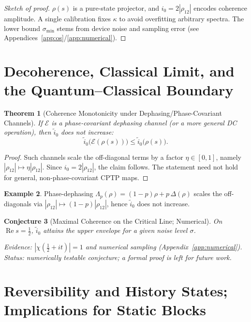 \documentclass[11pt]{article}
\newtheorem{theorem}{Theorem}[section]
\newtheorem{conjecture}[theorem]{Conjecture}
\theoremstyle{definition}
\newtheorem{example}[theorem]{Example}
\theoremstyle{remark}
\begin{document}
\begin{proof}[Sketch of proof]
\( \rho(s) \) is a pure-state projector, and \( i_0=2|\rho_{12}| \) encodes coherence amplitude. A single calibration fixes \( \kappa \) to avoid overfitting arbitrary spectra. The lower bound \( \sigma_{\min} \) stems from device noise and sampling error (see Appendices~\ref{app:os}/\ref{app:numerical}).
\end{proof}

\section{Decoherence, Classical Limit, and the Quantum--Classical Boundary}\label{sec:decoherence}

\begin{theorem}[Coherence Monotonicity under Dephasing/Phase-Covariant Channels]\label{thm:coherence}
If \( \mathcal{E} \) is a phase-covariant dephasing channel (or a more general DC operation), then \( \tilde i_0 \) does not increase:
\[
\tilde i_0\big(\mathcal{E}(\rho(s))\big) \le \tilde i_0\big(\rho(s)\big).
\]
\end{theorem}

\begin{proof}
Such channels scale the off-diagonal terms by a factor \( \eta\in[0,1] \), namely \( |\rho_{12}|\mapsto \eta|\rho_{12}| \). Since \( i_0=2|\rho_{12}| \), the claim follows. The statement need not hold for general, non-phase-covariant CPTP maps.
\end{proof}

\begin{example}
Phase-dephasing \( \Lambda_p(\rho)=(1-p)\rho+p\,\Delta(\rho) \) scales the off-diagonals via \( |\rho_{12}|\mapsto (1-p)|\rho_{12}| \), hence \( \tilde i_0 \) does not increase.
\end{example}

\begin{conjecture}[Maximal Coherence on the Critical Line; Numerical]\label{conj:maximal}
On \( \operatorname{Re}s=\tfrac{1}{2} \), \( \tilde i_0 \) attains the upper envelope for a given noise level \( \sigma \).

Evidence: \( |\chi(\tfrac{1}{2}+it)|=1 \) and numerical sampling (Appendix~\ref{app:numerical}). Status: numerically testable conjecture; a formal proof is left for future work.
\end{conjecture}

\section{Reversibility and History States; Implications for Static Blocks}\label{sec:reversibility}
\end{document}
